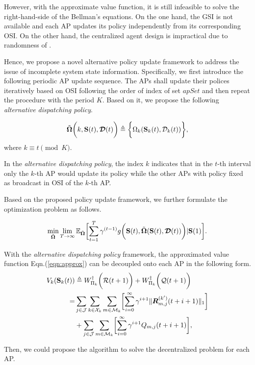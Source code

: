 However, with the approximate value function, it is still infeasible to solve the right-hand-side of the Bellman's equations.
On the one hand, the GSI is not available and each AP updates its policy independently from its corresponding OSI.
On the other hand, the centralized agent design is impractical due to randomness of \brlatency.

Hence, we propose a novel alternative policy update framework to address the issue of incomplete system state information.
Specifically, we first introduce the following periodic AP update sequence.
The APs shall update their polices iteratively based on OSI following the order of index of set $apSet$ and then repeat the procedure with the period $K$.
Based on it, we propose the following \emph{alternative dispatching policy}.
\begin{definition}
    \begin{align}
        \tilde{\boldsymbol{\Omega}}\bigg( k, \mathbf{S}(t), \boldsymbol{\mathcal{D}}(t) \bigg) \triangleq \bigg\{
            \Omega_{k}( \mathbf{S}_{k}(t), \mathcal{D}_{k}(t) )
        \bigg\},
    \end{align}
    where $k \equiv t \pmod{K}$.
\end{definition}
\begin{remark}
    In the \emph{alternative dispatching policy}, the index $k$ indicates that in the $t$-th interval only the $k$-th AP would update its policy while the other APs with policy fixed as broadcast in OSI of the $k$-th AP.
\end{remark}

Based on the proposed policy update framework, we further formulate the optimization problem as follows.
\begin{problem}
    \begin{align}
        \min_{\tilde{\Policy}} \lim_{T\to\infty} \mathbb{E}_{\tilde{\Policy}} \Bracket{
            \sum_{t=1}^{T} \gamma^{(t-1)} g\Paren{
                \Stat(t), \tilde{\Policy}(\Stat(t), \Delay(t))
            } | \Stat(1)
        }.
    \end{align}
    \label{problem_2}
\end{problem}

\begin{lemma}
    With the \emph{alternative dispatching policy} framework, the approximated value function Eqn.(\ref{eqn:approx}) can be decoupled onto each AP in the following form.
    \begin{align}
        V_{k}(\Stat_{k}(t)) &\define W^{\AP}_{\Pi_{k}}\Paren{\mathcal{R}(t+1)} + W^{\ES}_{\Pi_{k}}\Paren{\mathcal{Q}(t+1)}
        \nonumber\\
        =& \sum_{j\in\jSpace}\sum_{k\in\ccSet_{k}}\sum_{m\in\esSet_{k}} \Bracket{
            \sum_{i=0}^{\infty} \gamma^{i+1} \Inorm{ \vecG{R}^{(k')}_{m,j}(t+i+1) }
        }
        \nonumber\\
        & + \sum_{j\in\jSpace}\sum_{m\in\esSet_{k}} \Bracket{
            \sum_{i=0}^{\infty} \gamma^{i+1} Q_{m,j}(t+i+1)
        },
    \end{align}
\end{lemma}
Then, we could propose the algorithm to solve the decentralized problem for each AP.

